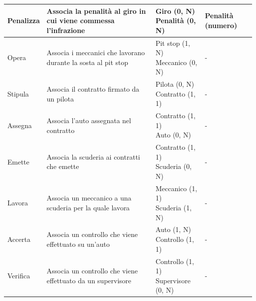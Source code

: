 \documentclass[11pt]{article}
\begin{document}
\begin{center}
{\begin{tabular}{ |l|p{5.5cm}|p{5cm}|p{4cm}| }
            \hline
            Penalizza & 
            Associa la penalità al giro in cui viene commessa l'infrazione & 
            \parbox[t]{\linewidth}{Giro (0, N)\\Penalità (0, N)} & 
            \parbox[t]{\linewidth}{Penalità (numero)} \\

            \hline
            Opera & 
            Associa i meccanici che lavorano durante la sosta al pit stop & 
            \parbox[t]{\linewidth}{Pit stop (1, N)\\Meccanico (0, N)} & 
            \parbox[t]{\linewidth}{-} \\

            \hline
            Stipula & 
            Associa il contratto firmato da un pilota & 
            \parbox[t]{\linewidth}{Pilota (0, N)\\Contratto (1, 1)} & 
            \parbox[t]{\linewidth}{-} \\

            \hline
            Assegna & 
            Associa l'auto assegnata nel contratto & 
            \parbox[t]{\linewidth}{Contratto (1, 1)\\Auto (0, N)} & 
            \parbox[t]{\linewidth}{-} \\

            \hline
            Emette & 
            Associa la scuderia ai contratti che emette & 
            \parbox[t]{\linewidth}{Contratto (1, 1)\\Scuderia (0, N)} & 
            \parbox[t]{\linewidth}{-} \\

            \hline
            Lavora & 
            Associa un meccanico a una scuderia per la quale lavora & 
            \parbox[t]{\linewidth}{Meccanico (1, 1)\\Scuderia (1, N)} & 
            \parbox[t]{\linewidth}{-} \\

            \hline
            Accerta & 
            Associa un controllo che viene effettuato su un'auto & 
            \parbox[t]{\linewidth}{Auto (1, N)\\Controllo (1, 1)} & 
            \parbox[t]{\linewidth}{-} \\
            
            \hline
            Verifica & 
            Associa un controllo che viene effettuato da un supervisore & 
            \parbox[t]{\linewidth}{Controllo (1, 1)\\Supervisore (0, N)} & 
            \parbox[t]{\linewidth}{-} \\
            
            \hline
        \end{tabular}
    }
\end{center}
\end{document}
